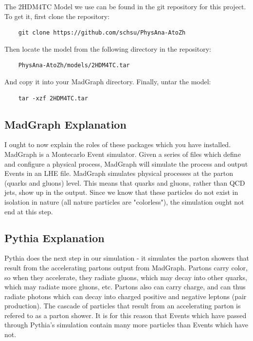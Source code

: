 \documentclass{article}
\begin{document}
The 2HDM4TC Model we use can be found in the git repository for this project.
To get it, first clone the repository:

\begin{verbatim}
	git clone https://github.com/schsu/PhysAna-AtoZh
\end{verbatim}

Then locate the model from the following directory in the repository:

\begin{verbatim}
	PhysAna-AtoZh/models/2HDM4TC.tar
\end{verbatim}

And copy it into your MadGraph directory. Finally, untar the model:

\begin{verbatim}
	tar -xzf 2HDM4TC.tar
\end{verbatim}

\subsection{MadGraph Explanation}

I ought to now explain the roles of these packages which you have installed. MadGraph is a Montecarlo Event simulator.
Given a series of files which define and configure a physical process, MadGraph will simulate the process and output
Events in an LHE file. MadGraph simulates physical processes at the parton (quarks and gluons) level. This means that quarks and gluons,
rather than QCD jets, show up in the output. Since we know that these particles do not exist in isolation in nature
(all nature particles are "colorless"), the simulation ought not end at this step.

\subsection{Pythia Explanation}

Pythia does the next step in our simulation - it simulates the parton showers that result from the accelerating
partons output from MadGraph. Partons carry color, so when they accelerate, they radiate gluons, which may decay
into other quarks, which may radiate more gluons, etc. Partons also can carry charge, and can thus radiate photons
which can decay into charged positive and negative leptons (pair production). The cascade of particles that
result from an accelerating parton is refered to as a parton shower. It is for this reason that Events which have
passed through Pythia's simulation contain many more particles than Events which have not.
\end{document}
